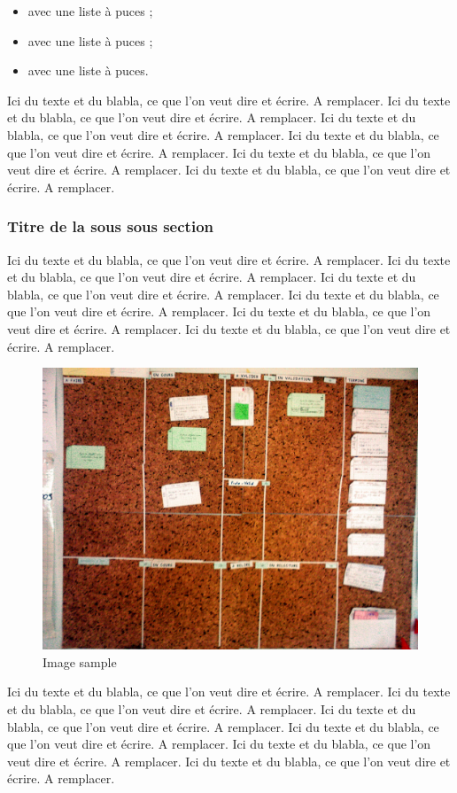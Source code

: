 \begin{itemize}
\item avec une liste à puces ;
\item avec une liste à puces ;
\item avec une liste à puces.
\end{itemize}

Ici du texte et du blabla, ce que l'on veut dire et écrire. A remplacer. Ici du texte et du blabla, ce que l'on veut dire et écrire. A remplacer. Ici du texte et du blabla, ce que l'on veut dire et écrire. A remplacer. Ici du texte et du blabla, ce que l'on veut dire et écrire. A remplacer. Ici du texte et du blabla, ce que l'on veut dire et écrire. A remplacer. Ici du texte et du blabla, ce que l'on veut dire et écrire. A remplacer.

\subsubsection{Titre de la sous sous section}

Ici du texte et du blabla, ce que l'on veut dire et écrire. A remplacer. Ici du texte et du blabla, ce que l'on veut dire et écrire. A remplacer. Ici du texte et du blabla, ce que l'on veut dire et écrire. A remplacer. Ici du texte et du blabla, ce que l'on veut dire et écrire. A remplacer. Ici du texte et du blabla, ce que l'on veut dire et écrire. A remplacer. Ici du texte et du blabla, ce que l'on veut dire et écrire. A remplacer.

\begin{figure}[!ht]
\centering
\includegraphics[width=.55\textwidth]{img/SP_A0183.jpg}
\caption{Image sample}
\label{figure:sampe}
\end{figure}

Ici du texte et du blabla, ce que l'on veut dire et écrire. A remplacer. Ici du texte et du blabla, ce que l'on veut dire et écrire. A remplacer. Ici du texte et du blabla, ce que l'on veut dire et écrire. A remplacer. Ici du texte et du blabla, ce que l'on veut dire et écrire. A remplacer. Ici du texte et du blabla, ce que l'on veut dire et écrire. A remplacer. Ici du texte et du blabla, ce que l'on veut dire et écrire. A remplacer.

